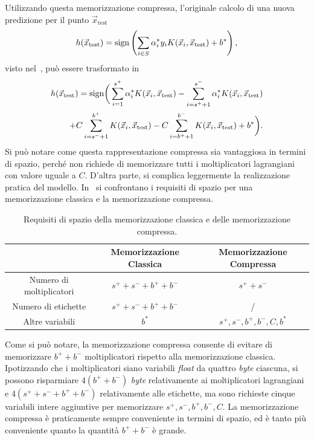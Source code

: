 Utilizzando questa memorizzazione compressa, l'originale calcolo di una nuova predizione per il punto $\Vec{x}_{\text{test}}$
\begin{equation*}
    h(\Vec{x}_{\text{test}}) = \mathrm{sign}\left(\sum_{i \in S}\alpha_i^*y_iK(\Vec{x}_i, \Vec{x}_\text{test}) + b^*\right),
\end{equation*}
visto nel~, può essere trasformato in
\begin{align*}
    h(\Vec{x}_{\text{test}}) = \mathrm{sign}\bigg(
            \sum_{i=1}^{s^+}\alpha_i^*K(\Vec{x}_i, \Vec{x}_\text{test}) 
            -\sum_{i=s^++1}^{s^-}\alpha_i^*K(\Vec{x}_i, \Vec{x}_\text{test})\\
            +C\sum_{i=s^-+1}^{b^+}K(\Vec{x}_i, \Vec{x}_\text{test})
            -C\sum_{i=b^++1}^{b^-}K(\Vec{x}_i, \Vec{x}_\text{test}) 
            + b^*
        \bigg).
\end{align*}
Si può notare come questa rappresentazione compressa sia vantaggiosa in termini di spazio, perché non richiede di memorizzare tutti i moltiplicatori lagrangiani con valore uguale a $C$.
D'altra parte, si complica leggermente la realizzazione pratica del modello.
In~ si confrontano i requisiti di spazio per una memorizzazione classica e la memorizzazione compressa.
\begin{table}
    \centering
    \begin{tabular}{c|c|c}
    \multicolumn{1}{c}{}    &  Memorizzazione Classica    & Memorizzazione Compressa \\     
    \toprule
    Numero di moltiplicatori    & $s^+ + s^- + b^+ + b^-$ & $s^+ +s^-$ \\
    \hline
    Numero di etichette         & $s^+ + s^- + b^+ + b^-$ &  / \\
    \hline
    Altre variabili             &         $b^*$          &  $s^+, s^-, b^+, b^-, C, b^*$ \\
    \bottomrule
    \end{tabular}
    \caption{Requisiti di spazio della memorizzazione classica e delle memorizzazione compressa.}
    \label{tab:compressione_spazio_risparmiato}
\end{table}
Come si può notare, la memorizzazione compressa consente di evitare di memorizzare $b^++b^-$ moltiplicatori rispetto alla memorizzazione classica.
Ipotizzando che i moltiplicatori siano variabili \emph{float} da quattro \emph{byte} ciascuna, si possono risparmiare $4(b^++b^-)$ \emph{byte} relativamente ai moltiplicatori lagrangiani e $4(s^+ + s^- + b^+ + b^-)$ relativamente alle etichette, ma sono richieste cinque variabili intere aggiuntive per memorizzare $s^+, s^-, b^+, b^-, C$.
La memorizzazione compressa è praticamente sempre conveniente in termini di spazio, ed è tanto più conveniente quanto la quantità $b^++b^-$ è grande.

